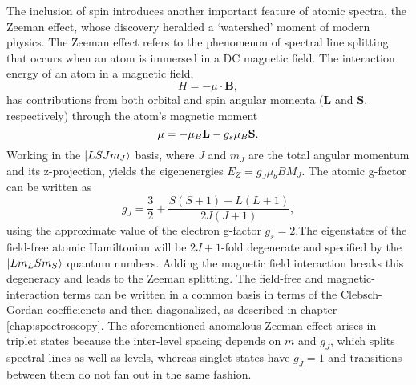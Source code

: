 	The inclusion of spin introduces another important feature of atomic spectra, the Zeeman effect, whose discovery heralded a `watershed' moment of modern physics. The Zeeman effect refers to the phenomenon of spectral line splitting that occurs when an atom is immersed in a DC magnetic field. The interaction energy of an atom in a magnetic field, 
	\begin{equation}
		H = -\mu\cdot \textbf{B},
	\end{equation}
	has contributions from both orbital and spin angular momenta ($\textbf{L}$ and $\textbf{S}$, respectively) through the atom's magnetic moment 
	\begin{equation}
		{\bf \mu} = -\mu_B\textbf{L} - g_s\mu_B \textbf{S}.
	\end{equation}
	Working in the $|LSJm_J\rangle$ basis, where $J$ and $m_J$ are the total angular momentum and its z-projection, yields the eigenenergies $E_Z = g_J \mu_b B M_J$. The atomic g-factor can be written as
	\begin{equation}
		g_J = \frac{3}{2} + \frac{S(S+1)-L(L+1)}{2J(J+1)},
	\end{equation}
	using the approximate value of the electron g-factor $g_s=2$.The eigenstates of the field-free atomic Hamiltonian will be $2J+1$-fold degenerate and specified by the $|Lm_L S m_S\rangle$ quantum numbers. Adding the magnetic field interaction breaks this degeneracy and leads to the Zeeman splitting. The field-free and magnetic-interaction terms can be written in a common basis in terms of the Clebsch-Gordan coefficiencts and then diagonalized, as described in chapter \ref{chap:spectroscopy}. The aforementioned anomalous Zeeman effect arises in triplet states because the inter-level spacing depends on $m$ and $g_J$, which splits spectral lines as well as levels, whereas singlet states have $g_J=1$ and transitions between them do not fan out in the same fashion. 

	


